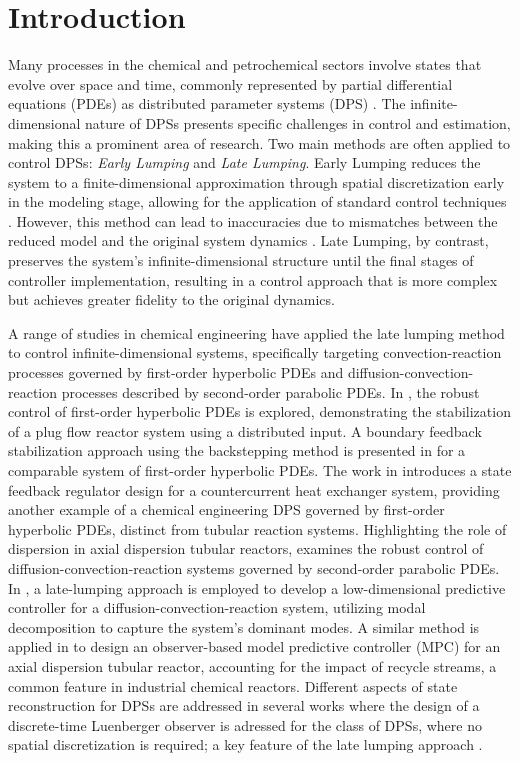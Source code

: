 \section{Introduction}

Many processes in the chemical and petrochemical sectors involve states that evolve over space and time, commonly represented by partial differential equations (PDEs) as distributed parameter systems (DPS) \cite{ray1981advanced}. 
The infinite-dimensional nature of DPSs presents specific challenges in control and estimation, making this a prominent area of research. Two main methods are often applied to control DPSs: \textit{Early Lumping} and \textit{Late Lumping}. 
Early Lumping reduces the system to a finite-dimensional approximation through spatial discretization early in the modeling stage, allowing for the application of standard control techniques \cite{davison1976robust}. 
However, this method can lead to inaccuracies due to mismatches between the reduced model and the original system dynamics \cite{moghadam2012infinite}. 
Late Lumping, by contrast, preserves the system's infinite-dimensional structure until the final stages of controller implementation, resulting in a control approach that is more complex but achieves greater fidelity to the original dynamics.

A range of studies in chemical engineering have applied the late lumping method to control infinite-dimensional systems, specifically targeting convection-reaction processes governed by first-order hyperbolic PDEs and diffusion-convection-reaction processes described by second-order parabolic PDEs. 
In \cite{christofides1996feedback}, the robust control of first-order hyperbolic PDEs is explored, demonstrating the stabilization of a plug flow reactor system using a distributed input. 
A boundary feedback stabilization approach using the backstepping method is presented in \cite{krstic2008backstepping} for a comparable system of first-order hyperbolic PDEs. 
The work in \cite{xu2016state} introduces a state feedback regulator design for a countercurrent heat exchanger system, providing another example of a chemical engineering DPS governed by first-order hyperbolic PDEs, distinct from tubular reaction systems. 
Highlighting the role of dispersion in axial dispersion tubular reactors, \cite{christofides1998robust} examines the robust control of diffusion-convection-reaction systems governed by second-order parabolic PDEs. 
In \cite{dubljevic2006predictive2}, a late-lumping approach is employed to develop a low-dimensional predictive controller for a diffusion-convection-reaction system, utilizing modal decomposition to capture the system's dominant modes. 
A similar method is applied in \cite{khatibi2021model} to design an observer-based model predictive controller (MPC) for an axial dispersion tubular reactor, accounting for the impact of recycle streams, a common feature in industrial chemical reactors. 
Different aspects of state reconstruction for DPSs are addressed in several works where the design of a discrete-time Luenberger observer is adressed for the class of DPSs, where no spatial discretization is required; a key feature of the late lumping approach  \cite{dochain2000state, dochain2001state, alonso2004optimal, ali2015review}.


